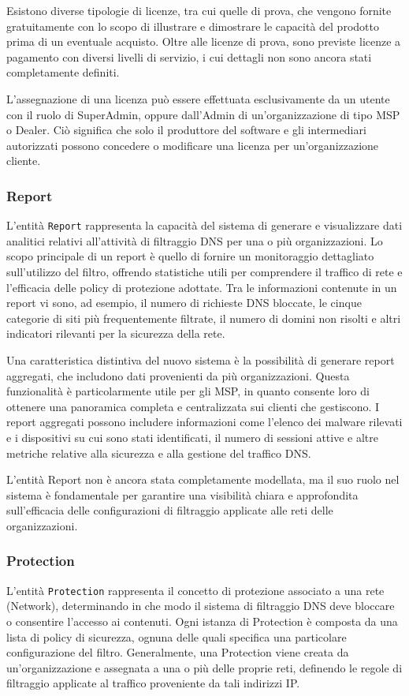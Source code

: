 Esistono diverse tipologie di licenze, tra cui quelle di prova, che vengono fornite gratuitamente con lo scopo di illustrare e dimostrare le capacità del prodotto prima di un eventuale acquisto. Oltre alle licenze di prova, sono previste licenze a pagamento con diversi livelli di servizio, i cui dettagli non sono ancora stati completamente definiti.

L'assegnazione di una licenza può essere effettuata esclusivamente da un utente con il ruolo di SuperAdmin, oppure dall’Admin di un’organizzazione di tipo MSP o Dealer. Ciò significa che solo il produttore del software e gli intermediari autorizzati possono concedere o modificare una licenza per un'organizzazione cliente.

\subsubsection{Report}
L'entità \texttt{Report} rappresenta la capacità del sistema di generare e visualizzare dati analitici relativi all'attività di filtraggio DNS per una o più organizzazioni. Lo scopo principale di un report è quello di fornire un monitoraggio dettagliato sull'utilizzo del filtro, offrendo statistiche utili per comprendere il traffico di rete e l'efficacia delle policy di protezione adottate. Tra le informazioni contenute in un report vi sono, ad esempio, il numero di richieste DNS bloccate, le cinque categorie di siti più frequentemente filtrate, il numero di domini non risolti e altri indicatori rilevanti per la sicurezza della rete.

Una caratteristica distintiva del nuovo sistema è la possibilità di generare report aggregati, che includono dati provenienti da più organizzazioni. Questa funzionalità è particolarmente utile per gli MSP, in quanto consente loro di ottenere una panoramica completa e centralizzata sui clienti che gestiscono. I report aggregati possono includere informazioni come l’elenco dei malware rilevati e i dispositivi su cui sono stati identificati, il numero di sessioni attive e altre metriche relative alla sicurezza e alla gestione del traffico DNS.

L'entità Report non è ancora stata completamente modellata, ma il suo ruolo nel sistema è fondamentale per garantire una visibilità chiara e approfondita sull’efficacia delle configurazioni di filtraggio applicate alle reti delle organizzazioni.

\subsubsection{Protection}
L'entità \texttt{Protection} rappresenta il concetto di protezione associato a una rete (Network), determinando in che modo il sistema di filtraggio DNS deve bloccare o consentire l'accesso ai contenuti. Ogni istanza di Protection è composta da una lista di policy di sicurezza, ognuna delle quali specifica una particolare configurazione del filtro. Generalmente, una Protection viene creata da un'organizzazione e assegnata a una o più delle proprie reti, definendo le regole di filtraggio applicate al traffico proveniente da tali indirizzi IP.

